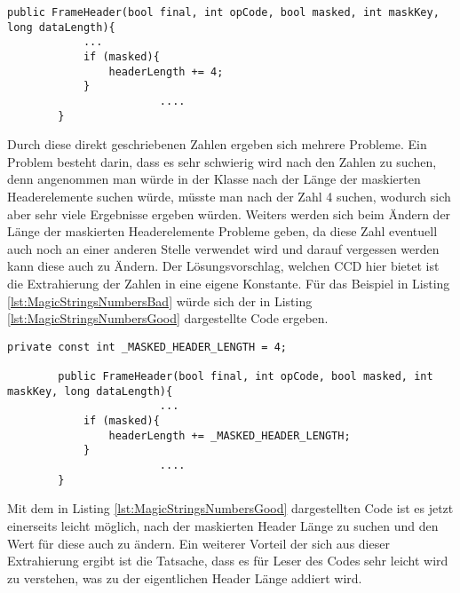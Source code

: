\begin{lstlisting}[language={[Sharp]C}, caption=MagicNumbers, label=lst:MagicStringsNumbersBad]
        public FrameHeader(bool final, int opCode, bool masked, int maskKey, long dataLength){
           	...
            if (masked){
                headerLength += 4;
            }
						....
        }
\end{lstlisting}

\SuperPar Durch diese direkt geschriebenen Zahlen ergeben sich mehrere Probleme. Ein Problem besteht darin, dass es sehr schwierig wird nach den Zahlen zu suchen, denn angenommen man würde in der Klasse nach der Länge der maskierten Headerelemente suchen würde, müsste man nach der Zahl 4 suchen, wodurch sich aber sehr viele Ergebnisse ergeben würden. Weiters werden sich beim Ändern der Länge der maskierten Headerelemente Probleme geben, da diese Zahl eventuell auch noch an einer anderen Stelle verwendet wird und darauf vergessen werden kann diese auch zu Ändern. Der Lösungsvorschlag, welchen CCD hier bietet ist die Extrahierung der Zahlen in eine eigene Konstante. Für das Beispiel in Listing \ref{lst:MagicStringsNumbersBad}  würde sich der in Listing \ref{lst:MagicStringsNumbersGood} dargestellte Code ergeben.

\begin{lstlisting}[language={[Sharp]C}, caption=Magic number, label=lst:MagicStringsNumbersGood]
				private const int _MASKED_HEADER_LENGTH = 4;
	
        public FrameHeader(bool final, int opCode, bool masked, int maskKey, long dataLength){
						...
            if (masked){
                headerLength += _MASKED_HEADER_LENGTH;
            }
						....
        }
\end{lstlisting}

\SuperPar Mit dem in Listing \ref{lst:MagicStringsNumbersGood} dargestellten Code ist es jetzt einerseits leicht möglich, nach der maskierten Header Länge zu suchen und den Wert für diese auch zu ändern. Ein weiterer Vorteil der sich aus dieser Extrahierung ergibt ist die Tatsache, dass es für Leser des Codes sehr leicht wird zu verstehen, was zu der eigentlichen Header Länge addiert wird. 



